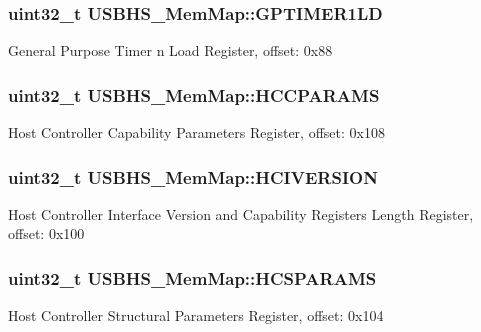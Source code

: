 \subsubsection[{G\+P\+T\+I\+M\+E\+R1\+L\+D}]{\setlength{\rightskip}{0pt plus 5cm}uint32\+\_\+t U\+S\+B\+H\+S\+\_\+\+Mem\+Map\+::\+G\+P\+T\+I\+M\+E\+R1\+L\+D}\label{struct_u_s_b_h_s___mem_map_a1243aa3b80b401c703ae05fb205957e2}
General Purpose Timer n Load Register, offset\+: 0x88 \hypertarget{struct_u_s_b_h_s___mem_map_a2f51d62adad266eff6d3e0fdd7c54d28}{}
\subsubsection[{H\+C\+C\+P\+A\+R\+A\+M\+S}]{\setlength{\rightskip}{0pt plus 5cm}uint32\+\_\+t U\+S\+B\+H\+S\+\_\+\+Mem\+Map\+::\+H\+C\+C\+P\+A\+R\+A\+M\+S}\label{struct_u_s_b_h_s___mem_map_a2f51d62adad266eff6d3e0fdd7c54d28}
Host Controller Capability Parameters Register, offset\+: 0x108 \hypertarget{struct_u_s_b_h_s___mem_map_a619bd669ea184df3bc0fefa28b266c9f}{}
\subsubsection[{H\+C\+I\+V\+E\+R\+S\+I\+O\+N}]{\setlength{\rightskip}{0pt plus 5cm}uint32\+\_\+t U\+S\+B\+H\+S\+\_\+\+Mem\+Map\+::\+H\+C\+I\+V\+E\+R\+S\+I\+O\+N}\label{struct_u_s_b_h_s___mem_map_a619bd669ea184df3bc0fefa28b266c9f}
Host Controller Interface Version and Capability Registers Length Register, offset\+: 0x100 \hypertarget{struct_u_s_b_h_s___mem_map_ad570cfba844f3beb44fb4f16d996b31a}{}
\subsubsection[{H\+C\+S\+P\+A\+R\+A\+M\+S}]{\setlength{\rightskip}{0pt plus 5cm}uint32\+\_\+t U\+S\+B\+H\+S\+\_\+\+Mem\+Map\+::\+H\+C\+S\+P\+A\+R\+A\+M\+S}\label{struct_u_s_b_h_s___mem_map_ad570cfba844f3beb44fb4f16d996b31a}
Host Controller Structural Parameters Register, offset\+: 0x104 \hypertarget{struct_u_s_b_h_s___mem_map_a107edcad73cd5c798c766e09940f3d7d}{}
